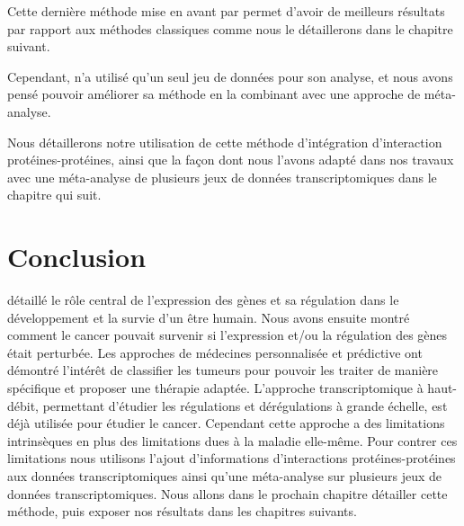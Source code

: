       Cette dernière méthode mise en avant par \citeauthor{Chuang2007} permet d'avoir de meilleurs résultats par rapport aux méthodes classiques comme nous le détaillerons dans le chapitre suivant.

      Cependant, \citeauthor{Chuang2007} n'a utilisé qu'un seul jeu de données pour son analyse, et nous avons pensé pouvoir améliorer sa méthode en la combinant avec une approche de méta-analyse.

      Nous détaillerons notre utilisation de cette méthode d'intégration d'interaction protéines-protéines, ainsi que la façon dont nous l'avons adapté dans nos travaux avec une méta-analyse de plusieurs jeux de données transcriptomiques dans le chapitre qui suit.

  \pagebreak

  \section{\textcolor{myred}{Conclusion}}

     détaillé le rôle central de l'expression des gènes et sa régulation dans le développement et la survie d'un être humain.
    Nous avons ensuite montré comment le cancer pouvait survenir si l'expression et/ou la régulation des gènes était perturbée.
    Les approches de médecines personnalisée et prédictive ont démontré l'intérêt de classifier les tumeurs pour pouvoir les traiter de manière spécifique et proposer une thérapie adaptée.
    L'approche transcriptomique à haut-débit, permettant d'étudier les régulations et dérégulations à grande échelle, est déjà utilisée pour étudier le cancer.
    Cependant cette approche a des limitations intrinsèques en plus des limitations dues à la maladie elle-même.
    Pour contrer ces limitations nous utilisons l'ajout d'informations d'interactions protéines-protéines aux données transcriptomiques ainsi qu'une méta-analyse sur plusieurs jeux de données transcriptomiques.
    Nous allons dans le prochain chapitre détailler cette méthode, puis exposer nos résultats dans les chapitres suivants.